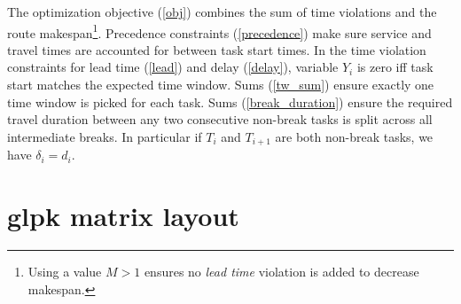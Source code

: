 \documentclass{article}
\begin{document}
The optimization objective (\ref{obj}) combines the sum of time
violations and the route makespan\footnote{Using a value $M > 1$
  ensures no \textit{lead time} violation is added to decrease
  makespan.}. Precedence constraints (\ref{precedence}) make sure
service and travel times are accounted for between task start
times. In the time violation constraints for lead time (\ref{lead})
and delay (\ref{delay}), variable $Y_i$ is zero iff task start matches
the expected time window. Sums (\ref{tw_sum}) ensure exactly one time
window is picked for each task. Sums (\ref{break_duration}) ensure the
required travel duration between any two consecutive non-break tasks
is split across all intermediate breaks. In particular if $T_i$ and
$T_{i + 1}$ are both non-break tasks, we have $\delta_i = d_i$.

\section{glpk matrix layout}

\setcounter{MaxMatrixCols}{30}
\end{document}
